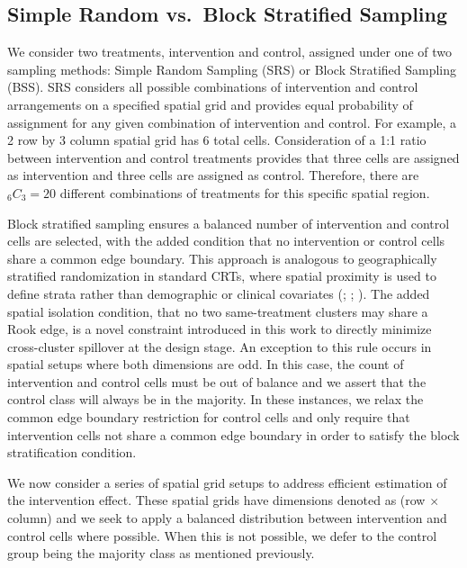 \documentclass[
  12pt,
  prelim]{bios-prelim}
\begin{document}
\subsection{Simple Random vs.~Block Stratified
Sampling}\label{simple-random-vs.-block-stratified-sampling}

We consider two treatments, intervention and control, assigned under one
of two sampling methods: Simple Random Sampling (SRS) or Block
Stratified Sampling (BSS). SRS considers all possible combinations of
intervention and control arrangements on a specified spatial grid and
provides equal probability of assignment for any given combination of
intervention and control. For example, a 2 row by 3 column spatial grid
has 6 total cells. Consideration of a 1:1 ratio between intervention and
control treatments provides that three cells are assigned as
intervention and three cells are assigned as control. Therefore, there
are \(_{6}C_{3}=20\) different combinations of treatments for this
specific spatial region.

Block stratified sampling ensures a balanced number of intervention and
control cells are selected, with the added condition that no
intervention or control cells share a common edge boundary. This
approach is analogous to geographically stratified randomization in
standard CRTs, where spatial proximity is used to define strata rather
than demographic or clinical covariates
(;
;
). The added
spatial isolation condition, that no two same-treatment clusters may
share a Rook edge, is a novel constraint introduced in this work to
directly minimize cross-cluster spillover at the design stage. An
exception to this rule occurs in spatial setups where both dimensions
are odd. In this case, the count of intervention and control cells must
be out of balance and we assert that the control class will always be in
the majority. In these instances, we relax the common edge boundary
restriction for control cells and only require that intervention cells
not share a common edge boundary in order to satisfy the block
stratification condition.

We now consider a series of spatial grid setups to address efficient
estimation of the intervention effect. These spatial grids have
dimensions denoted as (row \(\times\) column) and we seek to apply a
balanced distribution between intervention and control cells where
possible. When this is not possible, we defer to the control group being
the majority class as mentioned previously.
\end{document}
